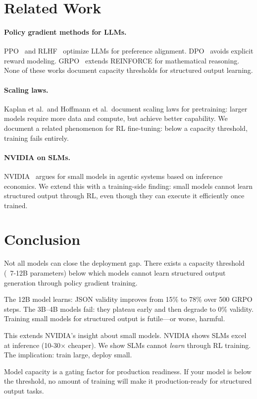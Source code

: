 \documentclass[11pt]{article}
\begin{document}
\section{Related Work}

\paragraph{Policy gradient methods for LLMs.}
PPO~\citep{schulman2017ppo} and RLHF~\citep{ouyang2022rlhf} optimize LLMs for preference alignment.
DPO~\citep{rafailov2023dpo} avoids explicit reward modeling.
GRPO~\citep{shao2024grpo} extends REINFORCE for mathematical reasoning.
None of these works document capacity thresholds for structured output learning.

\paragraph{Scaling laws.}
Kaplan et al.\ and Hoffmann et al.\ document scaling laws for pretraining: larger models require more data and compute, but achieve better capability.
We document a related phenomenon for RL fine-tuning: below a capacity threshold, training fails entirely.

\paragraph{NVIDIA on SLMs.}
NVIDIA~\citep{nvidia2025slm} argues for small models in agentic systems based on inference economics.
We extend this with a training-side finding: small models cannot learn structured output through RL, even though they can execute it efficiently once trained.

\section{Conclusion}

Not all models can close the deployment gap.
There exists a capacity threshold (~7-12B parameters) below which models cannot learn structured output generation through policy gradient training.

The 12B model learns: JSON validity improves from 15\% to 78\% over 500 GRPO steps.
The 3B--4B models fail: they plateau early and then degrade to 0\% validity.
Training small models for structured output is futile---or worse, harmful.

This extends NVIDIA's insight about small models.
NVIDIA shows SLMs excel at inference (10-30$\times$ cheaper).
We show SLMs cannot \emph{learn} through RL training.
The implication: train large, deploy small.

Model capacity is a gating factor for production readiness.
If your model is below the threshold, no amount of training will make it production-ready for structured output tasks.



\end{document}
